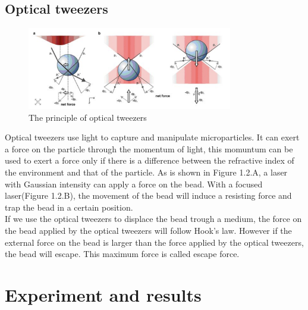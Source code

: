 \documentclass[a4paper,english,12pt,bibliography=totoc]{scrreprt}
\begin{document}
\section{Optical tweezers}
\begin{figure}[H]
    \centering
    \includegraphics[width = 0.8\textwidth]{Images/Opt.png}
    \caption{The principle of optical tweezers\cite{physics_world}}
\end{figure}
Optical tweezers use light to capture and manipulate microparticles. It can exert a force on the particle through the momentum of light, this momuntum can be used to exert a force only if there is a difference between the refractive index of the environment and that of the particle. As is shown in Figure 1.2.A, a laser with Gaussian intensity can apply a force on the bead. With a focused laser(Figure 1.2.B), the movement of the bead will induce a resisting force and trap the bead in a certain position.\\

If we  use the optical tweezers to displace the bead trough a medium, the force on the bead applied by the optical tweezers will follow Hook's law. However  if the external force on the bead is larger than the force applied by the optical tweezers, the bead will escape. This maximum force is called escape force.

\chapter{Experiment and results}
\label{cha:Experiment}
\end{document}

